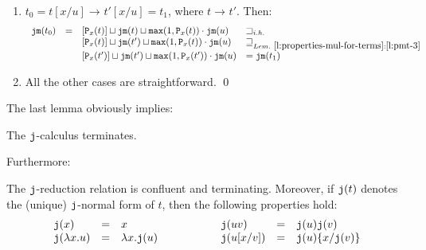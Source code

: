 \documentclass{LMCS}
\newcommand{\sep}{\hspace*{0.5cm}}
\renewcommand{\>}{\rightarrow}
\def\lam{\lambda}
\newcommand{\Rew}[1]{\rightarrow_{#1}}
\newcommand{\isubs}[1]{ \{ #1  \} }
\newcommand{\multiset}[1]{ [ #1 ] }
\newcommand{\dis}{{\tt j}}
\newcommand{\mul}[2]{{\tt P}_{#2}(#1)}
\newcommand{\ih}{i.h.}
\newcommand{\dm}[1]{\dis {\tt m}(#1)}
\newcommand{\maxi}[2]{{\tt max}(#1,#2)}
\newcommand{\ignore}[1]{}
\newcommand{\gm}{\sqsupset}
\newcommand{\geqm}{\sqsupseteq}
\begin{document}
\begin{enumerate}[$\bullet$]
       
\item $t_0  = t[x/u] \Rew{} t'[x/u]=t_1$, where $t \Rew{} t'$. Then:
      \[ \begin{array}{llllll}
      \dm{t_0} & = &
     \multiset{\mul{t}{x}}\sqcup \dm{t} \sqcup \maxi{1}{\mul{t}{x}} \cdot \dm{u}   & \gm_{\ih}\\ 
  &&    \multiset{\mul{t}{x}}\sqcup\dm{t'} \sqcup \maxi{1}{\mul{t}{x}} \cdot \dm{u}     & 
\geqm_{Lem.~\ref{l:properties-mul-for-terms}:\ref{l:pmt-3}}\\ 
 && \multiset{\mul{t'}{x}} \sqcup\dm{t'} \sqcup \maxi{1}{\mul{t'}{x}} \cdot \dm{u}   & =   \dm{t_1}
       \end{array} \]

\ignore{
\item $t_0  = t[x/u] \Rew{} t[x/u']=t_1$, where $u \Rew{} u'$. Then
      \[ \begin{array}{lll}
      \dm{t_0} & = \\
      \dm{t} \sqcup \maxi{1}{\mul{t}{x}} \cdot \dm{u}  \sqcup  \multiset{\mul{t}{x}} & \gm_{\ih}\\ 
      \dm{t} \sqcup \maxi{1}{\mul{t}{x}} \cdot \dm{u'}  \sqcup  \multiset{\mul{t}{x}} & =\\ 
      \dm{t_1}
       \end{array} \]
}
       
\item All the other cases are straightforward. 
\qed
\end{enumerate}


The last lemma obviously implies:

\begin{lem}
\label{l:dis-terminates}
The $\dis$-calculus terminates.
\end{lem}

Furthermore:

\begin{lem}
\label{l:uniqueness-j}
The $\dis$-reduction relation is confluent and terminating. Moreover,
if $\dis(t)$ denotes the (unique) $\dis$-normal form of $t$, then the following
properties hold:
\[ \begin{array}{lll@{\sep\sep\sep\sep}lll}
   \dis(x) & = & x & \dis(u v) & = & \dis(u) \dis(v)\\
   \dis(\lam x. u) & = & \lam x. \dis(u) & \dis(u[x/v]) & = & \dis(u)\isubs{x/\dis(v)}\\
   \end{array} \]
\end{lem}
\end{document}
